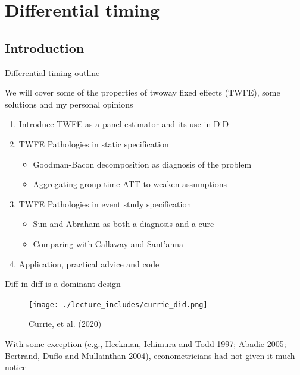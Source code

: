 \documentclass{beamer}
\begin{document}



\section{Differential timing}

\subsection{Introduction}

\begin{frame}{Differential timing outline}

We will cover some of the properties of twoway fixed effects (TWFE), some solutions and my personal opinions

\bigskip

\begin{enumerate}
	\item Introduce TWFE as a panel estimator and its use in DiD
	\item TWFE Pathologies in static specification
		\begin{itemize}
		\item Goodman-Bacon decomposition as diagnosis of the problem
		\item Aggregating group-time ATT to weaken assumptions
		\end{itemize}
	\item TWFE Pathologies in event study specification
		\begin{itemize}
		\item Sun and Abraham as both a diagnosis and a cure 
		\item Comparing with Callaway and Sant'anna
		\end{itemize}
	\item Application, practical advice and code
\end{enumerate}

\end{frame}	

\begin{frame}{Diff-in-diff is a dominant design}

	\begin{figure}
	\caption{Currie, et al. (2020)}
	\texttt{[image: ./lecture\_includes/currie\_did.png]}
	\end{figure}

\bigskip

\footnotesize

With some exception (e.g., Heckman, Ichimura and Todd 1997; Abadie 2005; Bertrand, Duflo and Mullainthan 2004), econometricians had not given it much notice

\end{frame}
\end{document}

